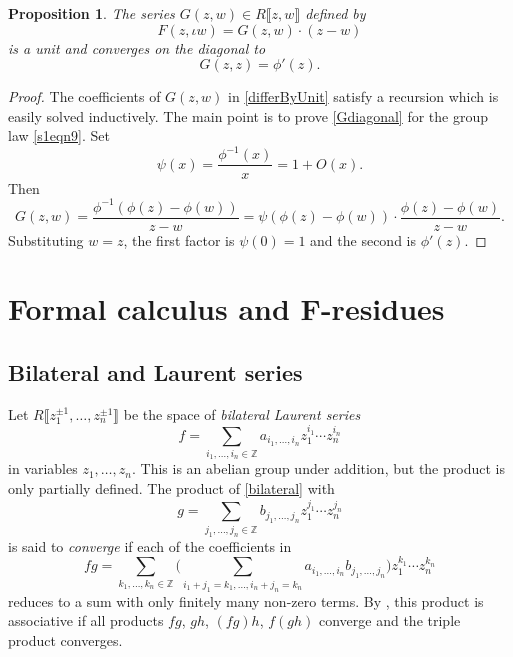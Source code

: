 \documentclass[pdftex]{sigma}
\numberwithin{equation}{section}
\newtheorem{Proposition}[Theorem]{Proposition}
\theoremstyle{definition}
\def\lb{\llbracket}
\def\rb{\rrbracket}
\begin{document}
\begin{Proposition}
 The series $G(z,w)\in R\lb z,w\rb$ defined by
\begin{equation}\label{differByUnit}
F(z,\iota w)=G(z,w)\cdot(z-w)
\end{equation}
is a unit and converges on the diagonal to
\begin{equation}
\label{Gdiagonal}
 G(z,z)=\phi'(z).
\end{equation}
\end{Proposition}

\begin{proof}
 The coefficients of $G(z,w)$ in \eqref{differByUnit} satisfy a recursion which is easily solved inductively. The main point is to prove \eqref{Gdiagonal} for the group law \eqref{s1eqn9}. Set
 \[
 \psi(x)=\frac{\phi^{-1}(x)}{x}=1+O(x).
 \]
 Then
 \[
 G(z,w)=\frac{\phi^{-1}(\phi(z)-\phi(w))}{z-w}=\psi(\phi(z)-\phi(w))\cdot \frac{\phi(z)-\phi(w)}{z-w}.
 \]
 Substituting $w=z$, the first factor is $\psi(0)=1$ and the second is $\phi'(z)$.
\end{proof}

\section[Formal calculus and F-residues]{Formal calculus and $\boldsymbol{F}$-residues}
\label{s3}

\subsection{Bilateral and Laurent series}
\label{s31}

Let $R\big\lb z_1^{\pm1},\dots,z_n^{\pm1}\big\rb$ be the space of \emph{bilateral Laurent series}
\begin{equation}
\label{bilateral}
 f=\sum_{i_1,\dots,i_n\in\mathbb{Z}} a_{i_1,\dots,i_n} z_1^{i_1}\cdots z_n^{i_n}
\end{equation}
in variables $z_1, \dots, z_n$. This is an abelian group under addition, but the product is only partially defined. The product of \eqref{bilateral} with
\[
 g=\sum_{j_1,\dots,j_n\in\mathbb{Z}} b_{j_1,\dots,j_n} z_1^{j_1}\cdots z_n^{j_n}
\]
is said to \emph{converge} if each of the coefficients in
\[
 fg = \sum_{k_1,\dots,k_n\in\mathbb{Z}} \Biggl(\sum_{i_1+j_1=k_1,\dots, i_n+j_n=k_n}a_{i_1,\dots,i_n}b_{j_1,\dots,j_n}\Biggr)z_1^{k_1}\cdots z_n^{k_n}
\]
reduces to a sum with only finitely many non-zero terms. By \cite[p.\ 24]{LL}, this product is associative if all products $fg$, $gh$, $(fg)h$, $f(gh)$ converge and the triple product converges.
\end{document}
